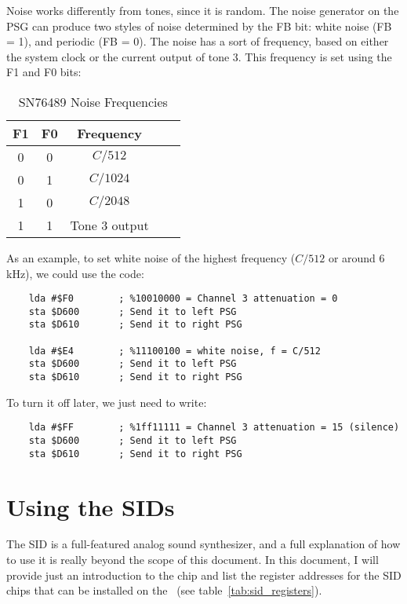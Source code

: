 Noise works differently from tones, since it is random. The noise generator on the PSG can produce two styles of noise determined by the FB bit: white noise (FB = 1), and periodic (FB = 0). The noise has a sort of frequency, based on either the system clock or the current output of tone 3. This frequency is set using the F1 and F0 bits:

\begin{table}
	\begin{center}
		\begin{tabular}{|c|c|c|c|l|} \hline
			F1 & F0 & Frequency \\ \hline \hline
			0 & 0 & $C / 512$ \\ \hline
			0 & 1 & $C / 1024$ \\ \hline
			1 & 0 & $C / 2048$ \\ \hline
			1 & 1 & Tone 3 output \\ \hline
		\end{tabular}
		\caption{SN76489 Noise Frequencies}
	\end{center}
	\label{tab:psg_noise_freq}
\end{table}

As an example, to set white noise of the highest frequency ($C / 512$ or around 6 kHz), we could use the code:

\begin{verbatim}
    lda #$F0        ; %10010000 = Channel 3 attenuation = 0
    sta $D600       ; Send it to left PSG
    sta $D610       ; Send it to right PSG

    lda #$E4        ; %11100100 = white noise, f = C/512
    sta $D600       ; Send it to left PSG
    sta $D610       ; Send it to right PSG
\end{verbatim}
To turn it off later, we just need to write:

\begin{verbatim}
    lda #$FF        ; %1ff11111 = Channel 3 attenuation = 15 (silence)
    sta $D600       ; Send it to left PSG
    sta $D610       ; Send it to right PSG
\end{verbatim}

\section{Using the SIDs}

The SID is a full-featured analog sound synthesizer, and a full explanation of how to use it is really beyond the scope of this document. In this document, I will provide just an introduction to the chip and list the register addresses for the SID chips that can be installed on the \jr\ (see table~\ref{tab:sid_registers}).

